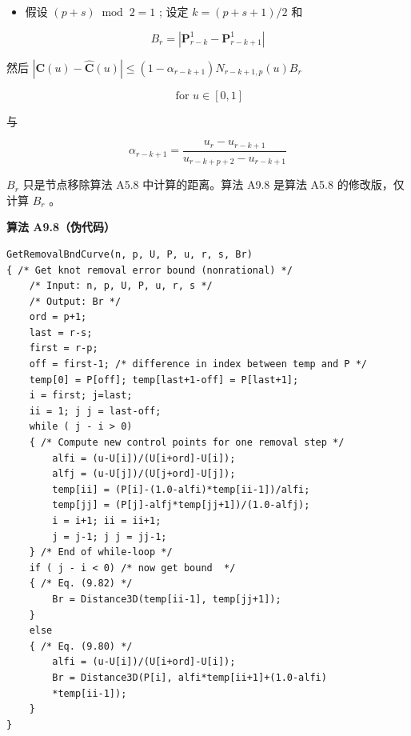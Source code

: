 \documentclass[../main.tex]{subfiles}
\begin{document}
\begin{itemize}
\item 假设 \(\left( {p + s}\right) {\;\operatorname{mod}\;2} = 1\) ; 设定 \(k = \left( {p + s + 1}\right) /2\) 和
\end{itemize}

\[
{B}_{r} = \left| {{\mathbf{P}}_{r - k}^{1} - {\mathbf{P}}_{r - k + 1}^{1}}\right|  \tag{9.82}
\]

然后 \(\left| {\mathbf{C}\left( u\right)  - \widehat{\mathbf{C}}\left( u\right) }\right|  \leq  \left( {1 - {\alpha }_{r - k + 1}}\right) {N}_{r - k + 1,p}\left( u\right) {B}_{r}\)

\[
\text{ for }u \in  \left\lbrack  {0,1}\right\rbrack   \tag{9.83}
\]

与

\[
{\alpha }_{r - k + 1} = \frac{{u}_{r} - {u}_{r - k + 1}}{{u}_{r - k + p + 2} - {u}_{r - k + 1}}
\]

\({B}_{r}\) 只是节点移除算法 A5.8 中计算的距离。算法 A9.8 是算法 A5.8 的修改版，仅计算 \({B}_{r}\) 。

\par\medskip\noindent\textbf{算法 A9.8（伪代码）}\par
\begin{verbatim}
GetRemovalBndCurve(n, p, U, P, u, r, s, Br)
{ /* Get knot removal error bound (nonrational) */
    /* Input: n, p, U, P, u, r, s */
    /* Output: Br */
    ord = p+1;
    last = r-s;
    first = r-p;
    off = first-1; /* difference in index between temp and P */
    temp[0] = P[off]; temp[last+1-off] = P[last+1];
    i = first; j=last;
    ii = 1; j j = last-off;
    while ( j - i > 0)
    { /* Compute new control points for one removal step */
        alfi = (u-U[i])/(U[i+ord]-U[i]);
        alfj = (u-U[j])/(U[j+ord]-U[j]);
        temp[ii] = (P[i]-(1.0-alfi)*temp[ii-1])/alfi;
        temp[jj] = (P[j]-alfj*temp[jj+1])/(1.0-alfj);
        i = i+1; ii = ii+1;
        j = j-1; j j = jj-1;
    } /* End of while-loop */
    if ( j - i < 0) /* now get bound  */
    { /* Eq. (9.82) */
        Br = Distance3D(temp[ii-1], temp[jj+1]);
    }
    else
    { /* Eq. (9.80) */
        alfi = (u-U[i])/(U[i+ord]-U[i]);
        Br = Distance3D(P[i], alfi*temp[ii+1]+(1.0-alfi)
        *temp[ii-1]);
    }
}
\end{verbatim}
\end{document}
